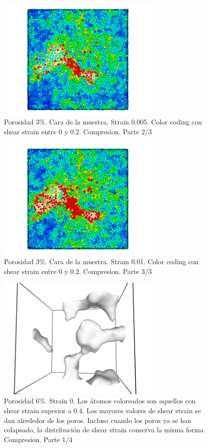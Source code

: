 \documentclass[10pt, oneside]{article} %
\begin{document}
\begin{figure}[H]
\centering
\includegraphics[width=8cm]{Figures/Porosidad/porosidad_3_faceAS_0_02_0005.png}
\caption{Porosidad 3\%. Cara de la muestra. Strain 0.005. Color coding con shear strain entre 0 y 0.2. Compresion. Parte 2/3}
\end{figure}

\begin{figure}[H]
\centering
\includegraphics[width=8cm]{Figures/Porosidad/porosidad_3_faceAS_0_02_001.png}
\caption{Porosidad 3\%. Cara de la muestra. Strain 0.01. Color coding con shear strain entre 0 y 0.2. Compresion. Parte 3/3}
\end{figure}

\begin{figure}[H]
\centering
\includegraphics[width=8cm]{Figures/Porosidad/porosidad_6_shearstrain04_0.png}
\caption{Porosidad 6\%. Strain 0. Los átomos coloreados son aquellos con shear strain superior a 0.4. Los mayores valores de shear strain se dan alrededor de los poros. Incluso cuando los poros ya se han colapsado, la distribución de shear strain conserva la misma forma. Compresion. Parte 1/4}
\end{figure}
\end{document}
